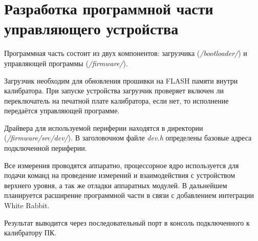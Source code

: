 \chapter{Разработка программной части управляющего устройства}

Программная часть состоит из двух компонентов: загрузчика (\emph{/bootloader/}) и управляющей программы (\emph{/firmware/}).

Загрузчик необходим для обновления прошивки на FLASH памяти внутри калибратора. При запуске устройства загрузчик проверяет
включен ли переключатель на печатной плате калибратора, если нет, то исполнение передаётся управляющей программе.

Драйвера для используемой периферии находятся в директории (\emph{/firmware/src/dev/}). В заголовочном файле \emph{dev.h}
определены базовые адреса подключенной периферии.

Все измерения проводятся аппаратно, процессорное ядро используется для подачи команд на проведение измерений и
взаимодействия с устройством верхнего уровня, а так же отладки аппаратных модулей.
В дальнейшем планируется расширение программной части в связи с добавлением интеграции
White Rabbit.

Результат выводится через последовательный порт в консоль подключенного к калибратору ПК.







\newpage